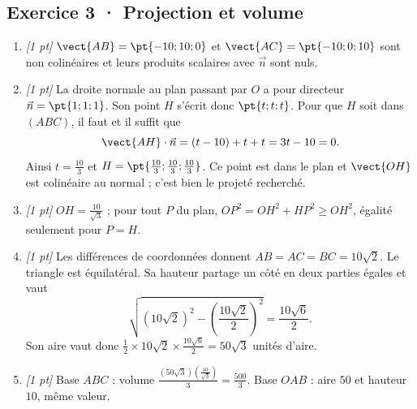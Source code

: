 \subsection*{Exercice 3 · Projection et volume}\begin{enumerate}

\item \textit{[1 pt]} $\vect{AB}=\pt{-10;10;0}$ et $\vect{AC}=\pt{-10;0;10}$ sont non colinéaires et leurs produits scalaires avec $\vec n$ sont nuls.

\item \textit{[1 pt]} La droite normale au plan passant par $O$ a pour directeur $\vec n=\pt{1;1;1}$. Son point $H$ s'écrit donc $\pt{t;t;t}$. Pour que $H$ soit dans $(ABC)$, il faut et il suffit que
\[\vect{AH}\cdot\vec n=(t-10)+t+t=3t-10=0.\]
Ainsi $t=\frac{10}{3}$ et $H=\pt{\frac{10}{3};\frac{10}{3};\frac{10}{3}}$. Ce point est dans le plan et $\vect{OH}$ est colinéaire au normal ; c'est bien le projeté recherché.

\item \textit{[1 pt]} $OH=\frac{10}{\sqrt{3}}$ ; pour tout $P$ du plan, $OP^2=OH^2+HP^2\ge OH^2$, égalité seulement pour $P=H$.

\item \textit{[1 pt]} Les différences de coordonnées donnent $AB=AC=BC=10\sqrt2$. Le triangle est équilatéral. Sa hauteur partage un côté en deux parties égales et vaut
\[\sqrt{(10\sqrt2)^2-(\frac{10\sqrt{2}}{2})^2}=\frac{10\sqrt6}{2}.\]
Son aire vaut donc $\frac12\times 10\sqrt2\times\frac{10\sqrt6}{2}=50\sqrt3$ unités d'aire.

\item \textit{[1 pt]} Base $ABC$ : volume $\frac{(50\sqrt3)(\frac{10}{\sqrt{3}})}{3}=\frac{500}{3}$. Base $OAB$ : aire $50$ et hauteur $10$, même valeur.

\end{enumerate}

